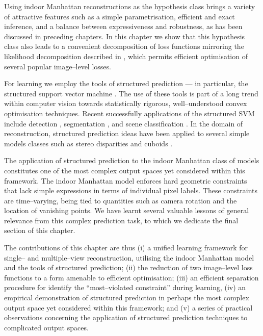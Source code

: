Using indoor Manhattan reconstructions as the hypothesis class brings
a variety of attractive features such as a simple parametrisation,
efficient and exact inference, and a balance between expressiveness
and robustness, as has been discussed in preceding chapters. In this
chapter we show that this hypothesis class also leads to a convenient
decomposition of loss functions mirroring the likelihood decomposition
described in , which permits efficient optimisation of
several popular image--level losses.

For learning we employ the tools of structured prediction --- in
particular, the structured support vector machine
\cite{Tsochantaridis04}. The use of these tools is part of a long
trend within computer vision towards statistically rigorous,
well--understood convex optimisation techniques. Recent successfully
applications of the structured SVM include detection
\cite{blaschko2008learning}, segmentation \cite{taskar2004max}, and
scene classification \cite{Yang2010}. In the domain of reconstruction,
structured prediction ideas have been applied to several simple models
classes such as stereo disparities \cite{li2008learning} and cuboids
\cite{Hedau09}.

The application of structured prediction to the indoor Manhattan class
of models constitutes one of the most complex output spaces yet
considered within this framework. The indoor Manhattan model enforces
hard geometric constraints that lack simple expressions in terms of
individual pixel labels. These constraints are time--varying,
being tied to quantities such as camera rotation and the location of
vanishing points. We have learnt several valuable lessons of general
relevance from this complex prediction task, to which we dedicate the
final section of this chapter.

The contributions of this chapter are thus (i) a unified learning
framework for single-- and multiple--view reconstruction, utilising
the indoor Manhattan model and the tools of structured prediction;
(ii) the reduction of two image--level loss functions to a form
amenable to efficient optimisation; (iii) an efficient separation
procedure for identify the ``most--violated constraint'' during
learning, (iv) an empirical demonstration of structured prediction in
perhaps the most complex output space yet considered within this
framework; and (v) a series of practical observations concerning the
application of structured prediction techniques to complicated output
spaces.


